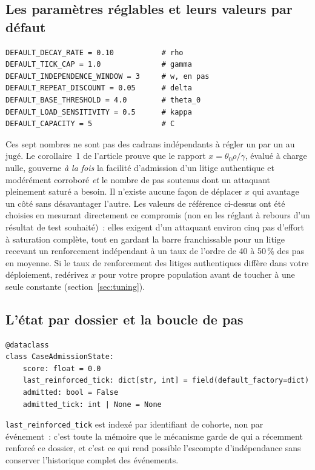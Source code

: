 \documentclass[11pt]{article}
\begin{document}
\subsection{Les paramètres réglables et leurs valeurs par défaut}

\begin{lstlisting}
DEFAULT_DECAY_RATE = 0.10           # rho
DEFAULT_TICK_CAP = 1.0              # gamma
DEFAULT_INDEPENDENCE_WINDOW = 3     # w, en pas
DEFAULT_REPEAT_DISCOUNT = 0.05      # delta
DEFAULT_BASE_THRESHOLD = 4.0        # theta_0
DEFAULT_LOAD_SENSITIVITY = 0.5      # kappa
DEFAULT_CAPACITY = 5                # C
\end{lstlisting}

Ces sept nombres ne sont pas des cadrans indépendants à régler un par un
au jugé. Le corollaire~1 de l'article prouve que le rapport
$x = \theta_0\rho/\gamma$, évalué à charge nulle, gouverne \emph{à la
fois} la facilité d'admission d'un litige authentique et modérément
corroboré \emph{et} le nombre de pas soutenus dont un attaquant
pleinement saturé a besoin. Il n'existe aucune façon de déplacer $x$ qui
avantage un côté sans désavantager l'autre. Les valeurs de référence
ci-dessus ont été choisies en mesurant directement ce compromis (non en
les réglant à rebours d'un résultat de test souhaité)~: elles exigent
d'un attaquant environ cinq pas d'effort à saturation complète, tout en
gardant la barre franchissable pour un litige recevant un renforcement
indépendant à un taux de l'ordre de 40 à 50\,\% des pas en moyenne. Si le
taux de renforcement des litiges authentiques diffère dans votre
déploiement, redérivez $x$ pour votre propre population avant de toucher
à une seule constante (section~\ref{sec:tuning}).

\subsection{L'état par dossier et la boucle de pas}

\begin{lstlisting}
@dataclass
class CaseAdmissionState:
    score: float = 0.0
    last_reinforced_tick: dict[str, int] = field(default_factory=dict)
    admitted: bool = False
    admitted_tick: int | None = None
\end{lstlisting}

\texttt{last\_reinforced\_tick} est indexé par identifiant de cohorte, non
par événement~: c'est toute la mémoire que le mécanisme garde de qui a
récemment renforcé ce dossier, et c'est ce qui rend possible l'escompte
d'indépendance sans conserver l'historique complet des événements.
\end{document}
